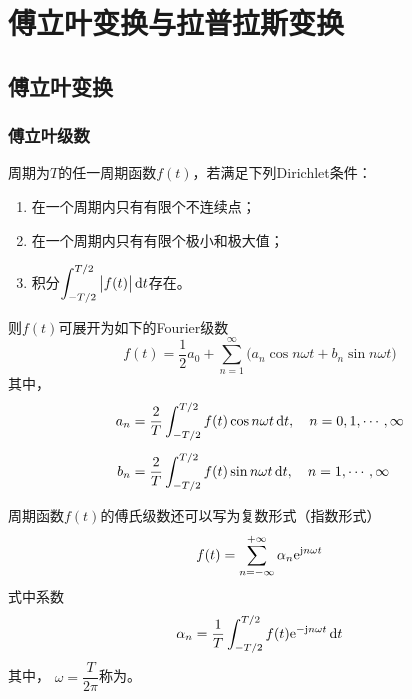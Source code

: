 \chapter{傅立叶变换与拉普拉斯变换}
\thispagestyle{empty}

\section{傅立叶变换}
\subsection{傅立叶级数}
\tdefination[傅立叶级数]
周期为$T$的任一周期函数$f(t)$，若满足下列Dirichlet条件：
\begin{enumerate}[\hspace*{3em} 1.]
	\item 在一个周期内只有有限个不连续点；
	\item 在一个周期内只有有限个极小和极大值；
	\item 积分$\displaystyle \int_{-T/2}^{T/2}\big|f(t)\big|\, {\rm{d}} t$存在。
\end{enumerate}
则$f(t)$可展开为如下的Fourier级数
\begin{equation}
	f(t) = \dfrac{1}{2}a_0 + \sum_{n = 1}^{\infty}\big(a_n \cos n\omega t + b_n \sin n \omega t\big)
\end{equation}
其中，
\begin{align}
	a_n &= \dfrac{2}{T}\int_{-T/2}^{T/2} f(t)\cos n \omega t \, {\rm{d}} t, \quad n = 0,1,\cdots,\infty\\[0.5em]
	b_n &= \dfrac{2}{T}\int_{-T/2}^{T/2} f(t)\sin n \omega t \, {\rm{d}} t, \quad n = 1,\cdots,\infty
\end{align}

周期函数$f(t)$的傅氏级数还可以写为复数形式（指数形式）
\begin{equation}
	f(t) = \sum_{n = -\infty}^{+\infty}\alpha_n{\rm{e}}^{\text{j} n \omega t}
\end{equation}
式中系数
\begin{equation}
	\alpha_n = \dfrac{1}{T}\int_{-T/2}^{T/2} f(t){\rm{e}}^{-\text{j} n \omega t}\, {\rm{d}} t
\end{equation}
其中， $\omega = \dfrac{T}{2\pi}$称为。
\vspace*{0.5em}

